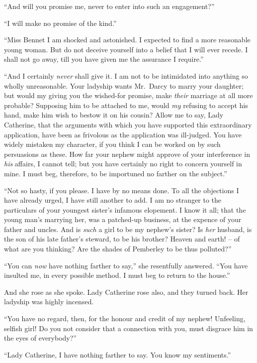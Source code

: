 “And will you promise me, never to enter into such an
engagement?”

“I will make no promise of the kind.”

“Miss Bennet I am shocked and astonished. I expected
to find a more reasonable young woman. But do not
deceive yourself into a belief that I will ever recede.
I shall not go away, till you have given me the assurance
I require.”

“And I certainly \textit{never} shall give it. I am not to be
intimidated into anything so wholly unreasonable. Your
ladyship wants Mr.\ Darcy to marry your daughter; but
would my giving you the wished-for promise, make \textit{their}
marriage at all more probable? Supposing him to be
attached to me, would \textit{my} refusing to accept his hand,
make him wish to bestow it on his cousin? Allow me to
say, Lady Catherine, that the arguments with which you
have supported this extraordinary application, have been
as frivolous as the application was ill-judged. You have
widely mistaken my character, if you think I can be
worked on by such persuasions as these. How far your
nephew might approve of your interference in \textit{his} affairs,
I cannot tell; but you have certainly no right to concern
yourself in mine. I must beg, therefore, to be importuned
no farther on the subject.”

“Not so hasty, if you please. I have by no means
done. To all the objections I have already urged, I have
still another to add. I am no stranger to the particulars
of your youngest sister’s infamous elopement. I know
it all; that the young man’s marrying her, was a patched-up
business, at the expence of your father and uncles.
And is \textit{such} a girl to be my nephew’s sister? Is \textit{her} husband,
is the son of his late father’s steward, to be his brother?
Heaven and earth! -- of what are you thinking? Are the
shades of Pemberley to be thus polluted?”

“You can \textit{now} have nothing farther to say,” she resentfully
answered. “You have insulted me, in every possible
method. I must beg to return to the house.”

And she rose as she spoke. Lady Catherine rose also,
and they turned back. Her ladyship was highly
incensed.

“You have no regard, then, for the honour and credit
of my nephew! Unfeeling, selfish girl! Do you not consider
that a connection with you, must disgrace him in
the eyes of everybody?”

“Lady Catherine, I have nothing farther to say. You
know my sentiments.”

